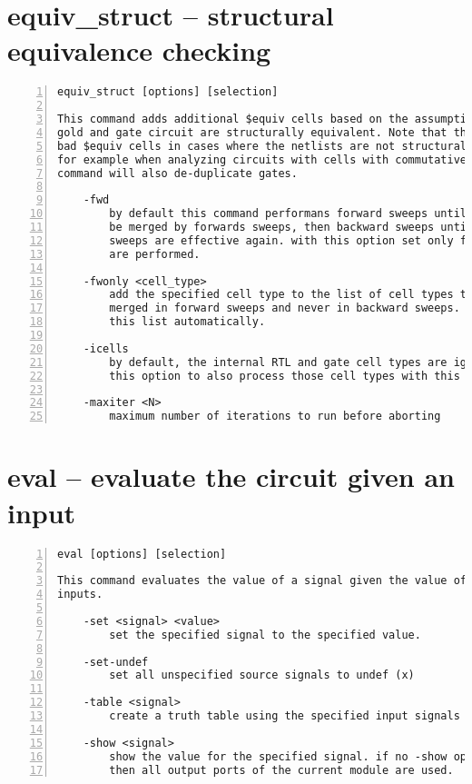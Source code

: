 \section{equiv\_struct -- structural equivalence checking}
\label{cmd:equiv_struct}
\begin{lstlisting}[numbers=left,frame=single]
    equiv_struct [options] [selection]

This command adds additional $equiv cells based on the assumption that the
gold and gate circuit are structurally equivalent. Note that this can introduce
bad $equiv cells in cases where the netlists are not structurally equivalent,
for example when analyzing circuits with cells with commutative inputs. This
command will also de-duplicate gates.

    -fwd
        by default this command performans forward sweeps until nothing can
        be merged by forwards sweeps, then backward sweeps until forward
        sweeps are effective again. with this option set only forward sweeps
        are performed.

    -fwonly <cell_type>
        add the specified cell type to the list of cell types that are only
        merged in forward sweeps and never in backward sweeps. $equiv is in
        this list automatically.

    -icells
        by default, the internal RTL and gate cell types are ignored. add
        this option to also process those cell types with this command.

    -maxiter <N>
        maximum number of iterations to run before aborting
\end{lstlisting}

\section{eval -- evaluate the circuit given an input}
\label{cmd:eval}
\begin{lstlisting}[numbers=left,frame=single]
    eval [options] [selection]

This command evaluates the value of a signal given the value of all required
inputs.

    -set <signal> <value>
        set the specified signal to the specified value.

    -set-undef
        set all unspecified source signals to undef (x)

    -table <signal>
        create a truth table using the specified input signals

    -show <signal>
        show the value for the specified signal. if no -show option is passed
        then all output ports of the current module are used.
\end{lstlisting}

